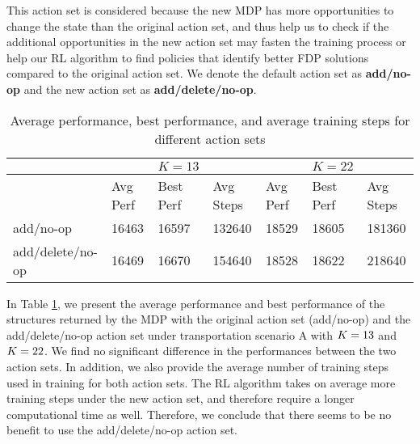 \documentclass{article} %
\begin{document}
This action set is considered because the new MDP has more opportunities to change the state than the original action set, and thus help us to check if the additional opportunities in the new action set may fasten the training process or help our RL algorithm to find policies that identify better FDP solutions compared to the original action set. We denote the default action set as \textbf{add/no-op} and the new action set as \textbf{add/delete/no-op}.


\begin{table}[htp]
\small
\begin{center}
\caption{Average performance, best performance, and average training steps for different action sets}
\label{table:ablationaction}
\begin{tabular}{l|lll|lll}
\toprule[1.2pt]
&   & $K=13$ &  &  &$K=22$ & \\ \hline
 & Avg Perf & Best Perf & Avg Steps & Avg Perf & Best Perf & Avg Steps \\
add/no-op & 16463 & 16597 & 132640 & 18529 & 18605 & 181360 \\
add/delete/no-op & 16469 & 16670 & 154640 & 18528 & 18622 & 218640  \\
\bottomrule[1.2pt]
\end{tabular}
\end{center}
\end{table}



In Table \ref{table:ablationaction}, we present the average performance and best performance of the structures returned by the MDP with the original action set (add/no-op) and the add/delete/no-op action set under transportation scenario A with $K=13$ and $K=22$. We find no significant difference in the performances between the two action sets. In addition, we also provide the average number of training steps used in training for both action sets. The RL algorithm takes on average more training steps under the new action set, and therefore require a longer computational time as well. Therefore, we conclude that there seems to be no benefit to use the  add/delete/no-op action set.
\end{document}
